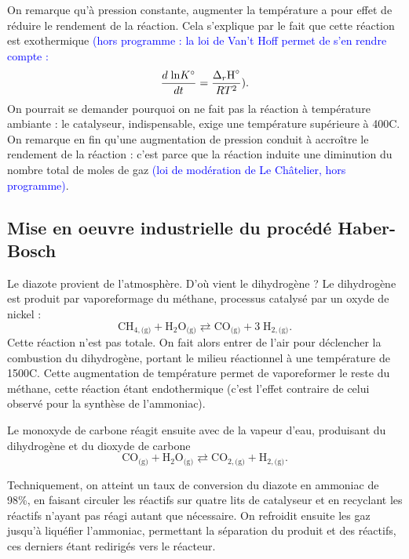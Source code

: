 \documentclass[11pt,a4paper]{report}
\begin{document}
On remarque qu'à pression constante, augmenter la température a pour effet de réduire le rendement de la réaction. Cela s'explique par le fait que cette réaction est exothermique \textcolor{blue}{(hors programme : la loi de Van't Hoff permet de s'en rendre compte :
\begin{equation}
	\frac{d\;\text{ln}K\degree}{dt} = \frac{\Delta_r\text{H}\degree}{RT^2}).
\end{equation}
}
On pourrait se demander pourquoi on ne fait pas la réaction à température ambiante : le catalyseur, indispensable, exige une température supérieure à 400\degree C.\\

On remarque en fin qu'une augmentation de pression conduit à accroître le rendement de la réaction : c'est parce que la réaction induite une diminution du nombre total de moles de gaz \textcolor{blue}{(loi de modération de Le Châtelier, hors programme)}.

\newpage
\subsection{Mise en oeuvre industrielle du procédé Haber-Bosch}

Le diazote provient de l'atmosphère. D'où vient le dihydrogène ? Le dihydrogène est produit par vaporeformage du méthane, processus catalysé par un oxyde de nickel :
\begin{equation}
	\text{CH}_{4,\text{(g)}} + \text{H}_2\text{O}_\text{(g)} \rightleftarrows
	\text{CO}_\text{(g)} + 3\;\text{H}_{2,\text{(g)}}.
\end{equation}
Cette réaction n'est pas totale. On fait alors entrer de l'air pour déclencher la combustion du dihydrogène, portant le milieu réactionnel à une température de 1500\degree C. Cette augmentation de température permet de vaporeformer le reste du méthane, cette réaction étant endothermique (c'est l'effet contraire de celui observé pour la synthèse de l'ammoniac).

Le monoxyde de carbone réagit ensuite avec de la vapeur d'eau, produisant du dihydrogène et du dioxyde de carbone
\begin{equation}
	\text{CO}_\text{(g)} + \text{H}_2\text{O}_\text{(g)} \rightleftarrows
	\text{CO}_{2,\text{(g)}} + \text{H}_{2,\text{(g)}}.
\end{equation} 

Techniquement, on atteint un taux de conversion du diazote en ammoniac de 98\%, en faisant circuler les réactifs sur quatre lits de catalyseur et en recyclant les réactifs n'ayant pas réagi autant que nécessaire. On refroidit ensuite les gaz jusqu'à liquéfier l'ammoniac, permettant la séparation du produit et des réactifs, ces derniers étant redirigés vers le réacteur.
\end{document}
